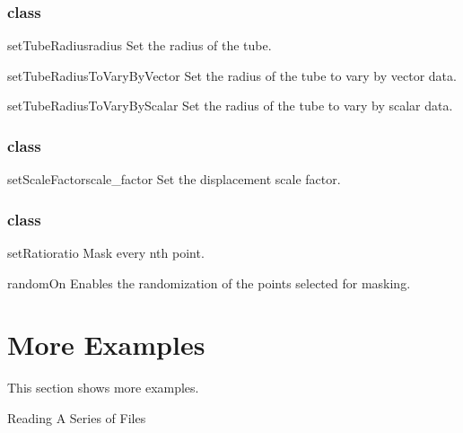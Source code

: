 \subsubsection{\Tube class}

\begin{methoddesc}[Tube]{setTubeRadius}{radius}
Set the radius of the tube.
\end{methoddesc}

\begin{methoddesc}[Tube]{setTubeRadiusToVaryByVector}{}
Set the radius of the tube to vary by vector data.
\end{methoddesc}

\begin{methoddesc}[Tube]{setTubeRadiusToVaryByScalar}{}
Set the radius of the tube to vary by scalar data.
\end{methoddesc}

\subsubsection{\Warp class}

\begin{methoddesc}[Warp]{setScaleFactor}{scale_factor}
Set the displacement scale factor.
\end{methoddesc}

\subsubsection{\MaskPoints class}

\begin{methoddesc}[MaskPoints]{setRatio}{ratio}
Mask every nth point.
\end{methoddesc}

\begin{methoddesc}[MaskPoints]{randomOn}{}
Enables the randomization of the points selected for masking.
\end{methoddesc}




\section{More Examples}
This section shows more examples.

\textsf{Reading A Series of Files}

